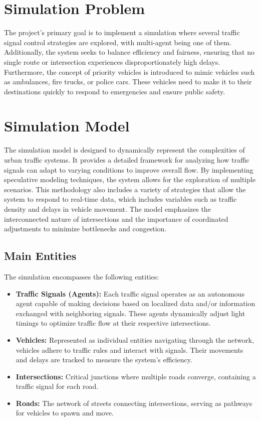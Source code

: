 \documentclass[sigconf]{acmart}
\begin{document}
\section{Simulation Problem}

The project’s primary goal is to implement a simulation where several traffic signal control strategies are explored, with multi-agent being one of them. Additionally, the system seeks to balance efficiency and fairness, ensuring that no single route or intersection experiences disproportionately high delays.
Furthermore, the concept of priority vehicles is introduced to mimic vehicles such as ambulances, fire trucks, or police cars. These vehicles need to make it to their destinations quickly to respond to emergencies and ensure public safety. 

\section{Simulation Model}

The simulation model is designed to dynamically represent the complexities of urban traffic systems. It provides a detailed framework for analyzing how traffic signals can adapt to varying conditions to improve overall flow. By implementing speculative modeling techniques, the system allows for the exploration of multiple scenarios. This methodology also includes a variety of strategies that allow the system to respond to real-time data, which includes variables such as traffic density and delays in vehicle movement. The model emphasizes the interconnected nature of intersections and the importance of coordinated adjustments to minimize bottlenecks and congestion.

\subsection{Main Entities}

The simulation encompasses the following entities:
\begin{itemize}
    \item \textbf{Traffic Signals (Agents):} Each traffic signal operates as an autonomous agent capable of making decisions based on localized data and/or information exchanged with neighboring signals. These agents dynamically adjust light timings to optimize traffic flow at their respective intersections.
    \item \textbf{Vehicles:} Represented as individual entities navigating through the network, vehicles adhere to traffic rules and interact with signals. Their movements and delays are tracked to measure the system's efficiency.
    \item \textbf{Intersections:} Critical junctions where multiple roads converge, containing a traffic signal for each road.
    \item \textbf{Roads:}  The network of streets connecting intersections,  serving as pathways for vehicles to spawn and move.
\end{itemize}
\end{document}
